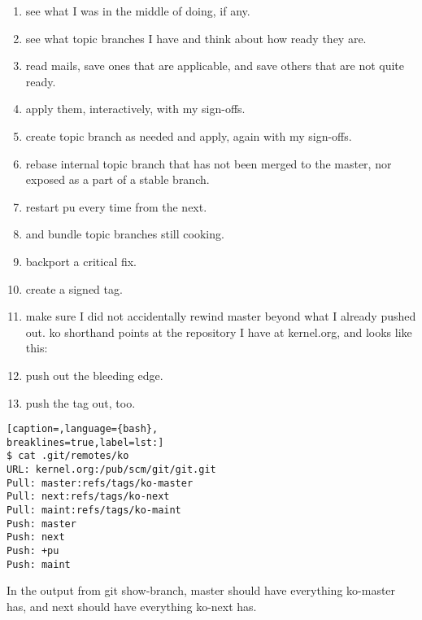 \begin{enumerate}
\setlength{\itemsep}{0cm}
\setlength{\parskip}{0cm}
\item see what I was in the middle of doing, if any.
\item see what topic branches I have and think about how ready they are.
\item read mails, save ones that are applicable, and save others that are not
quite ready.
\item apply them, interactively, with my sign-offs.
\item create topic branch as needed and apply, again with my sign-offs.
\item rebase internal topic branch that has not been merged to the master, nor
exposed as a part of a stable branch.
\item restart pu every time from the next.
\item and bundle topic branches still cooking.
\item backport a critical fix.
\item create a signed tag.
\item make sure I did not accidentally rewind master beyond what I already
pushed out. ko shorthand points at the repository I have at kernel.org, and
looks like this:
\item push out the bleeding edge.
\item push the tag out, too.
\end{enumerate}

\lstset{basicstyle=\scriptsize, numbers=none, captionpos=b, tabsize=4}
\begin{lstlisting}[caption=,language={bash},
breaklines=true,label=lst:]
$ cat .git/remotes/ko
URL: kernel.org:/pub/scm/git/git.git
Pull: master:refs/tags/ko-master
Pull: next:refs/tags/ko-next
Pull: maint:refs/tags/ko-maint
Push: master
Push: next
Push: +pu
Push: maint
\end{lstlisting}

In the output from git show-branch, master should have everything ko-master
has, and next should have everything ko-next has.
